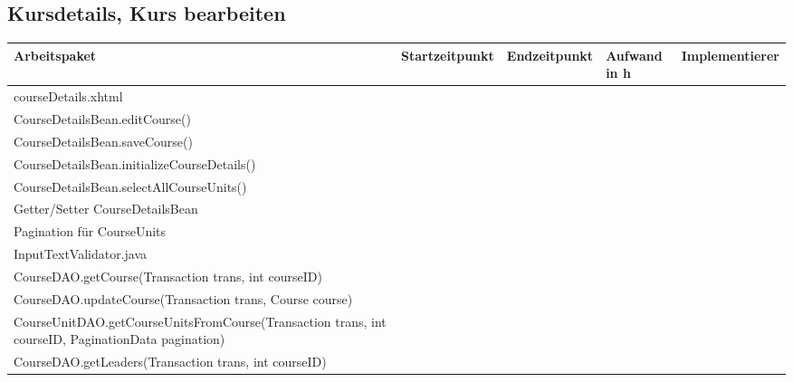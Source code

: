 \begin{landscape}
	\subsection{Kursdetails, Kurs bearbeiten}
	\begin{tabular}{|p{10cm}|p{4cm}|p{3cm}|p{3cm}|p{3cm}|}
		\hline  \textbf{Arbeitspaket} & \textbf{Startzeitpunkt} & \textbf{Endzeitpunkt} & \textbf{Aufwand in h} & \textbf{Implementierer} \\ 
		\hline   courseDetails.xhtml                                         &                            &                             &                     &\\
		\hline   CourseDetailsBean.editCourse()                              &                            &                             &                     &\\
		\hline   CourseDetailsBean.saveCourse()                              &                            &                             &                     &\\
		\hline   CourseDetailsBean.initializeCourseDetails()                 &                            &                             &                     &\\
		\hline   CourseDetailsBean.selectAllCourseUnits()                    &                            &                             &                     &\\
		\hline   Getter/Setter CourseDetailsBean                             &                            &                             &                     &\\
		\hline   Pagination für CourseUnits                                  &                            &                             &                     &\\
		\hline   InputTextValidator.java                                     &                            &                             &                     &\\ 
		\hline   CourseDAO.getCourse(Transaction trans, int courseID)        &                            &                             &                     &\\ 
		\hline   CourseDAO.updateCourse(Transaction trans, Course course)    &                            &                             &                     &\\
		\hline   CourseUnitDAO.getCourseUnitsFromCourse(Transaction trans, int courseID, PaginationData pagination) &                            &                             &                     &\\
		\hline   CourseDAO.getLeaders(Transaction trans, int courseID)    &                            &                             &                     &\\
		\hline 
	\end{tabular} \ \\
	\ \\
	

\end{landscape}
